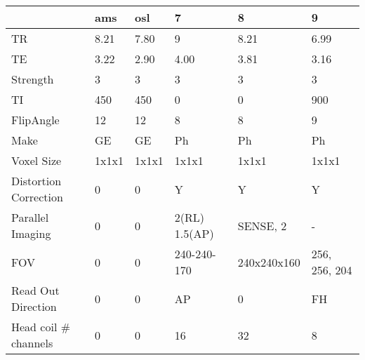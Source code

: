 \begin{table}
[]
\centering
\begin{tabular}{llllll}
\toprule
{} & ams & osl &              7 &      8 &        9 \\
\midrule
TR                    &                   8.21 &               7.80 &                                  9 &                    8.21 &                        6.99 \\
TE                    &                   3.22 &               2.90 &                               4.00 &                    3.81 &                        3.16 \\
Strength              &                      3 &                  3 &                                  3 &                       3 &                           3 \\
TI                    &                    450 &                450 &                                  0 &                       0 &                         900 \\
FlipAngle             &                     12 &                 12 &                                  8 &                       8 &                           9 \\
Make                  &                     GE &                 GE &                                 Ph &                      Ph &                          Ph \\
Voxel Size            &                  1x1x1 &              1x1x1 &                              1x1x1 &                   1x1x1 &                       1x1x1 \\
Distortion Correction &                      0 &                  0 &                                  Y &                       Y &                           Y \\
Parallel Imaging      &                      0 &                  0 &                      2(RL) 1.5(AP) &                SENSE, 2 &                           - \\
FOV                   &                      0 &                  0 &  240-240-170 &  240x240x160  &  256, 256, 204 \\
Read Out Direction    &                      0 &                  0 &                                 AP &                       0 &                          FH \\
Head coil \# channels  &                      0 &                  0 &                                 16 &                      32 &                           8 \\

\end{tabular}
\end{table}
